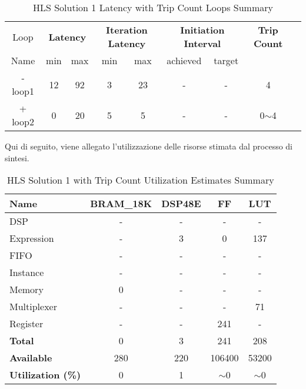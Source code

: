 \begin{table}[H]
	\centering
	\begin{tabular}{|c|c|c|c|c|c|c|c|c|}
		\hline
		\multicolumn{1}{|c|}{Loop} & \multicolumn{2}{|c|}{\textbf{Latency}} & \multicolumn{2}{c|}{\textbf{Iteration Latency}} & \multicolumn{2}{c|}{\textbf{Initiation Interval}} & \multicolumn{1}{c|}{\textbf{Trip Count}}  \\
		Name & min & max & min & max & achieved & target &  \\
		\hline
		- loop1 & 12 & 92 & 3 & 23 & - & - & 4 \\
		+ loop2 & 0 & 20 & 5 & 5 & - & - & 0$\sim$4 \\
		\hline
	\end{tabular}
	\caption{HLS Solution 1 Latency with Trip Count Loops Summary }
	\label{tab:hls-solution-1-loop-summary}
\end{table}

Qui di seguito, viene allegato l'utilizzazione delle risorse stimata dal processo di sintesi.
\begin{table}[h]
	\centering
	\begin{tabular}{|l|c|c|c|c|}
		\hline
		\textbf{Name}    & \textbf{BRAM\_18K} & \textbf{DSP48E} & \textbf{FF} & \textbf{LUT} \\ \hline
		DSP              & -                   & -               & -           & -            \\ 
		Expression       & -                   & 3               & 0           & 137          \\ 
		FIFO             & -                   & -               & -           & -            \\ 
		Instance         & -                   & -               & -           & -            \\ 
		Memory           & 0                   & -               & -          & -            \\ 
		Multiplexer      & -                   & -               & -           & 71          \\ 
		Register         & -                   & -               & 241         & -            \\ \hline
		\textbf{Total}   & 0                   & 3               & 241         & 208          \\ \hline
		\textbf{Available} & 280               & 220             & 106400      & 53200        \\ \hline
		\textbf{Utilization (\%)} & 0            & 1               & $\sim$0     & $\sim$0      \\ \hline
	\end{tabular}
	\caption{HLS Solution 1 with Trip Count Utilization Estimates Summary}
	\label{tab:hls-solution-1-utilization-estimates-summary}
\end{table}

